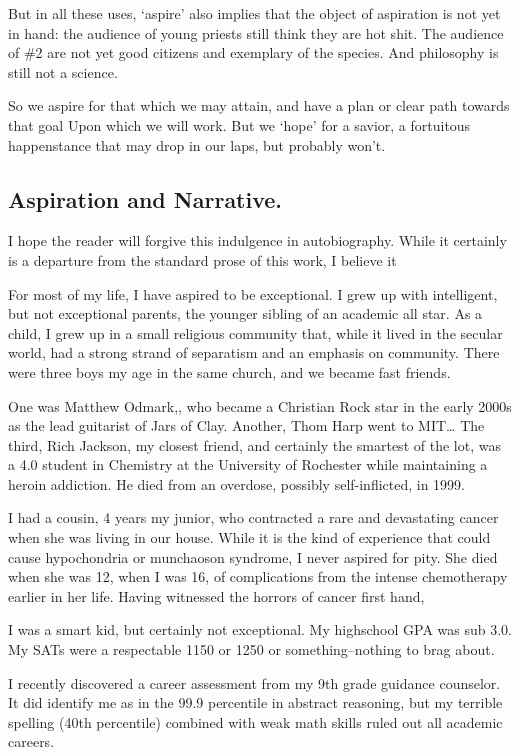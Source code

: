 But in all these uses, `aspire' also implies that the object of aspiration is not yet in hand: the audience of young priests still think they are hot shit. The audience of \#2 are not yet good citizens and exemplary of the species. And philosophy is still not a science. 

So we aspire for that which we may attain, and have a plan or clear path towards that goal Upon which we will work. But we `hope' for a savior, a fortuitous happenstance that may drop in our laps, but probably won't.

\subsection{Aspiration and Narrative.}
\label{aspirationandnarrative.}

I hope the reader will forgive this indulgence in autobiography. While it certainly is a departure from the standard prose of this work, I believe it

For most of my life, I have aspired to be exceptional. I grew up with intelligent, but not exceptional parents, the younger sibling of an academic all star. As a child, I grew up in a small religious community that, while it lived in the secular world, had a strong strand of separatism and an emphasis on community. There were three boys my age in the same church, and we became fast friends.

One was Matthew Odmark,, who became a Christian Rock star in the early 2000s as the lead guitarist of Jars of Clay. Another, Thom Harp went to MIT{\ldots} The third, Rich Jackson, my closest friend, and certainly the smartest of the lot, was a 4.0 student in Chemistry at the University of Rochester while maintaining a heroin addiction. He died from an overdose, possibly self-inflicted, in 1999.

I had a cousin, 4 years my junior, who contracted a rare and devastating cancer when she was living in our house. While it is the kind of experience that could cause hypochondria or munchaoson syndrome, I never aspired for pity. She died when she was 12, when I was 16, of complications from the intense chemotherapy earlier in her life. Having witnessed the horrors of cancer first hand, 

I was a smart kid, but certainly not exceptional. My highschool GPA was sub 3.0. My SATs were a respectable 1150 or 1250 or something--nothing to brag about.

I recently discovered a career assessment from my 9th grade guidance counselor. It did identify me as in the 99.9 percentile in abstract reasoning, but my terrible spelling (40th percentile) combined with weak math skills ruled out all academic careers.

